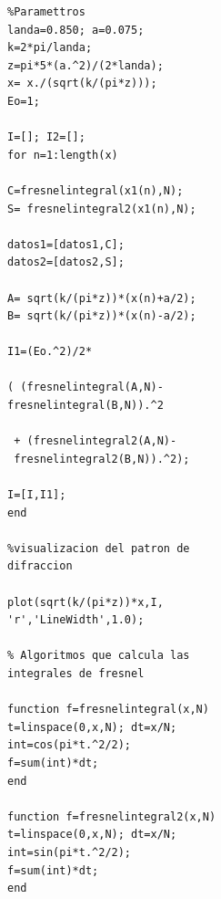 \documentclass[11pt,letterpaper,twocolumn]{article}
\begin{document}
\begin{lstlisting}
%Paramettros
landa=0.850; a=0.075;
k=2*pi/landa; 
z=pi*5*(a.^2)/(2*landa); 
x= x./(sqrt(k/(pi*z))); 
Eo=1; 

I=[]; I2=[]; 
for n=1:length(x)

C=fresnelintegral(x1(n),N); 
S= fresnelintegral2(x1(n),N); 
    
datos1=[datos1,C];  
datos2=[datos2,S]; 
    
A= sqrt(k/(pi*z))*(x(n)+a/2); 
B= sqrt(k/(pi*z))*(x(n)-a/2); 
    
I1=(Eo.^2)/2*

( (fresnelintegral(A,N)-
fresnelintegral(B,N)).^2

 + (fresnelintegral2(A,N)-
 fresnelintegral2(B,N)).^2); 

I=[I,I1]; 
end

%visualizacion del patron de 
difraccion

plot(sqrt(k/(pi*z))*x,I,
'r','LineWidth',1.0); 

% Algoritmos que calcula las
integrales de fresnel

function f=fresnelintegral(x,N)
t=linspace(0,x,N); dt=x/N;  
int=cos(pi*t.^2/2); 
f=sum(int)*dt; 
end 

function f=fresnelintegral2(x,N)
t=linspace(0,x,N); dt=x/N;  
int=sin(pi*t.^2/2); 
f=sum(int)*dt; 
end 
\end{lstlisting}
\end{document}
